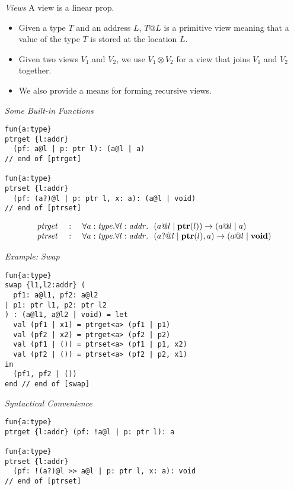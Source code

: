 \documentclass[pdf]{prosper}
\def\saddr{{\it addr}}
\def\stype{{\it type}}
\def\tptr{\mbox{\bf ptr}}
\def\tvoid{\mbox{\bf void}}
\def\timp{\rightarrow}
\begin{document}
\begin{slide}{\em Views}
A view is a linear prop.
\begin{itemize}
\item
Given a type $T$ and an address $L$, $T@L$ is a primitive view
meaning that a value of the type $T$ is stored at the location $L$.
\item
Given two views $V_1$ and $V_2$, we use $V_1\otimes V_2$ for a
view that joins $V_1$ and $V_2$ together.
\item
We also provide a means for forming recursive views. 
\end{itemize}
\end{slide}
\def\tptr{\mbox{\bf ptr}}
\def\fptrget{{\it ptrget}}
\def\fptrset{{\it ptrset}}
\begin{slide}{\em Some Built-in Functions}
{\blue\begin{verbatim}
fun{a:type}
ptrget {l:addr}
  (pf: a@l | p: ptr l): (a@l | a)
// end of [ptrget]

fun{a:type}
ptrset {l:addr}
  (pf: (a?)@l | p: ptr l, x: a): (a@l | void)
// end of [ptrset]
\end{verbatim}
}
\[\begin{array}{rcl}
\fptrget &~:~& \forall a:\stype.\forall l:\saddr.~~(a@l \mid \tptr(l)) \timp (a@l \mid a) \\
\fptrset &~:~& \forall a:\stype.\forall l:\saddr.~~(a?@l \mid \tptr(l), a)\timp (a@l \mid \tvoid) \\
\end{array}\]
\end{slide}
\begin{slide}{\em Example: {\it Swap}}
{\blue\begin{verbatim}
fun{a:type}
swap {l1,l2:addr} (
  pf1: a@l1, pf2: a@l2
| p1: ptr l1, p2: ptr l2
) : (a@l1, a@l2 | void) = let
  val (pf1 | x1) = ptrget<a> (pf1 | p1)
  val (pf2 | x2) = ptrget<a> (pf2 | p2)
  val (pf1 | ()) = ptrset<a> (pf1 | p1, x2)
  val (pf2 | ()) = ptrset<a> (pf2 | p2, x1)
in
  (pf1, pf2 | ())
end // end of [swap]
\end{verbatim}
}
\end{slide}
\begin{slide}{\em Syntactical Convenience}
{\blue\begin{verbatim}
fun{a:type}
ptrget {l:addr} (pf: !a@l | p: ptr l): a

fun{a:type}
ptrset {l:addr}
  (pf: !(a?)@l >> a@l | p: ptr l, x: a): void
// end of [ptrset]
\end{verbatim}
}
\end{slide}
\end{document}
